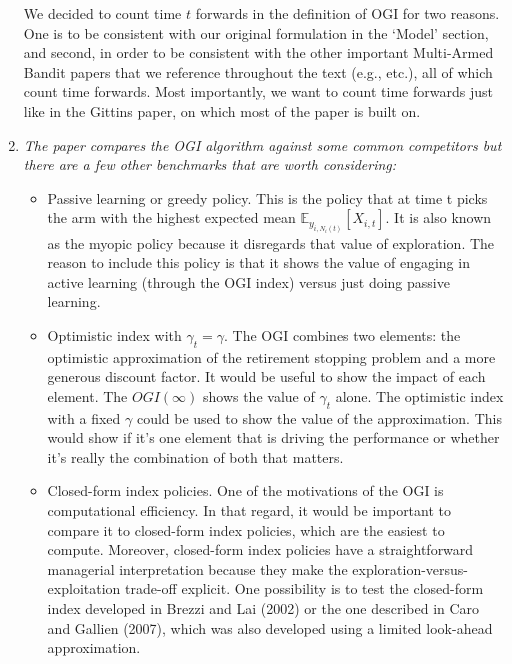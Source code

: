 \documentclass[11pt]{article}
\newcommand{\1}{\ensuremath{\mathbf{1}}} %
\theoremstyle{thm-sf}
\begin{document}
\begin{enumerate}
		We decided to count time $t$ forwards in the definition of OGI for two reasons. One is to be consistent with our original formulation in the `Model' section, and second, in order to be consistent with the other important Multi-Armed Bandit papers that we reference throughout the text (e.g., \cite{lai1985asymptotically,auer2002finite,gittins1979bandit} etc.), all of which count time forwards. Most importantly, we want to count time forwards just like in the Gittins paper, on which most of the paper is built on.
	
		\item {\it The paper compares the OGI algorithm against some common competitors but there are a few other benchmarks that are worth considering:
		\begin{itemize}
			\item Passive learning or greedy policy. This is the policy that at time t picks the arm with the highest expected mean $\mathbb E_{y_{i, N_i(t)}}[X_{i,t}]$. It is also known as the myopic policy because it disregards that value of exploration. The reason to include this policy is that it shows the value of engaging in active learning (through the OGI index) versus just doing passive learning.
			
			\item Optimistic index with $\gamma_t = \gamma$. The OGI combines two elements: the optimistic approximation of the retirement stopping problem and a more generous discount factor. It would be useful to show the impact of each element. The $OGI(\infty)$ shows the value of $\gamma_t$ alone. The optimistic index with a fixed $\gamma$ could be used to show the value of the approximation. This would show if it's one element that is driving the performance or whether it's really the combination of both that matters.
			
			\item Closed-form index policies. One of the motivations of the OGI is computational efficiency. In that regard, it would be important to compare it to closed-form index policies, which are the easiest to compute. Moreover, closed-form index policies have a straightforward managerial interpretation because they make the exploration-versus- exploitation trade-off explicit. One possibility is to test the closed-form index developed in Brezzi and Lai (2002) or the one described in Caro and Gallien (2007), which was also developed using a limited look-ahead approximation.
	\end{itemize}}
	

\end{enumerate}
\end{document}
